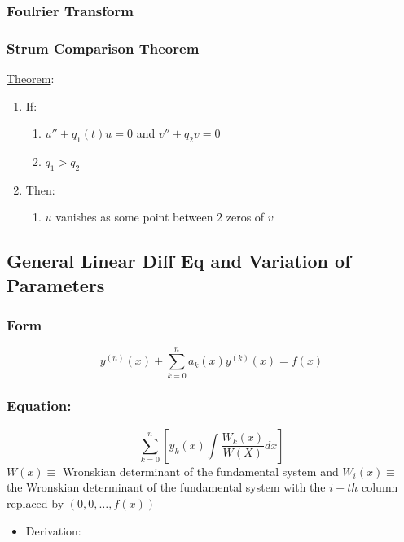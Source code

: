 \documentclass[11pt]{article}
\begin{document}
\subsubsection{Foulrier Transform}
\label{sec-9.2.6}

\subsubsection{Strum Comparison Theorem}
\label{sec-9.2.7}

    \underline{Theorem}: 
\begin{enumerate}
\item If:

\begin{enumerate}
\item $u''+q_1(t)u=0$ and $v''+q_2v =0$
\item $q_1>q_2$
\end{enumerate}

\item Then:

\begin{enumerate}
\item $u$ vanishes as some point between $2$ zeros of $v$
\end{enumerate}

\end{enumerate}
\subsection{General Linear Diff Eq and Variation of Parameters}
\label{sec-9.3}

\subsubsection{Form}
\label{sec-9.3.1}

    \begin{equation}
    y^{(n)}(x)+\sum_{k=0}^na_k(x)y^{(k)}(x)=f(x)
    \end{equation}
\subsubsection{Equation:}
\label{sec-9.3.2}

    \begin{equation}
    \sum_{k=0}^n[y_k(x)\int{\frac{W_k(x)}{W(X)}dx}]
    \end{equation}
    $W(x)\equiv$ Wronskian determinant of the fundamental system
    and $W_i(x)\equiv$ the Wronskian determinant of the fundamental system
    with the $i-th$ column replaced by $(0,0,\ldots,f(x))$   
\begin{itemize}

\item Derivation:\\
\label{sec-9.3.2.1}


\end{itemize} %
\end{document}
